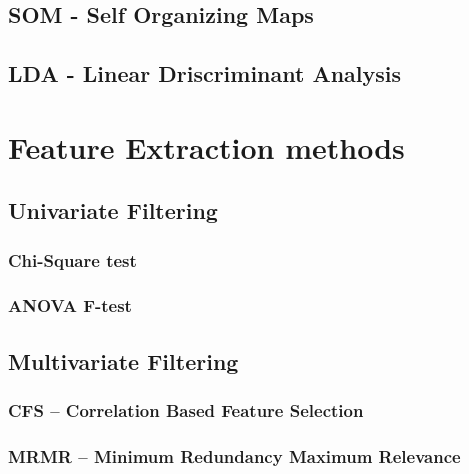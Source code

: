 \subsection{SOM - Self Organizing Maps} %
\label{sec:som}

\subsection{LDA - Linear Driscriminant Analysis} %
\label{sec:lda}

\section{Feature Extraction methods} %
\label{sec:feature_extraction}


\subsection{Univariate Filtering} %
\label{sec:inserting_tables}

\subsubsection{Chi-Square test} %
\label{sec:inserting_tables}

\subsubsection{ANOVA F-test} %
\label{sec:inserting_tables}

\subsection{Multivariate Filtering} %
\label{sec:inserting_tables}

\subsubsection{CFS – Correlation Based Feature Selection} %
\label{sec:inserting_tables}

\subsubsection{MRMR – Minimum Redundancy Maximum Relevance} %
\label{sec:inserting_tables}